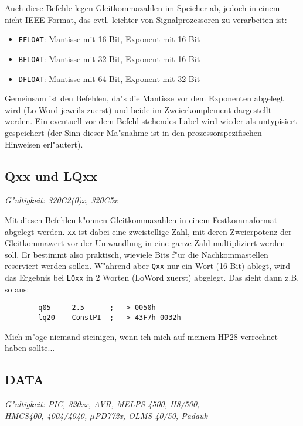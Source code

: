 \documentclass[12pt,a4paper,twoside]{report}
\makeatletter
\newcommand{\tty}[1]{{\tt #1}}
\newcommand{\ttindex}[1]{\index{#1@{\tt #1}}}
\makeatother
\begin{document}
Auch diese Befehle legen Gleitkommazahlen im Speicher ab,
jedoch in einem nicht-IEEE-Format, das evtl. leichter von
Signalprozessoren zu verarbeiten ist:
\begin{itemize}
\item{\tty{EFLOAT}: Mantisse mit 16 Bit, Exponent mit 16 Bit}
\item{\tty{BFLOAT}: Mantisse mit 32 Bit, Exponent mit 16 Bit}
\item{\tty{DFLOAT}: Mantisse mit 64 Bit, Exponent mit 32 Bit}
\end{itemize}
Gemeinsam ist den Befehlen, da"s die Mantisse vor dem
Exponenten abgelegt wird (Lo-Word jeweils zuerst) und
beide im Zweierkomplement dargestellt werden.  Ein eventuell
vor dem Befehl stehendes Label wird wieder als untypisiert
gespeichert (der Sinn dieser Ma"snahme ist in den
prozessorspezifischen Hinweisen erl"autert).


\subsection{Qxx und LQxx}
\ttindex{Qxx}\ttindex{LQxx}

{\em G"ultigkeit: 320C2(0)x, 320C5x}

Mit diesen Befehlen k"onnen Gleitkommazahlen in einem Festkommaformat
abgelegt werden.  \tty{xx} ist dabei eine zweistellige Zahl, mit deren
Zweierpotenz der Gleitkommawert vor der Umwandlung in eine ganze Zahl
multipliziert werden soll.  Er bestimmt also praktisch, wieviele Bits
f"ur die Nachkommastellen reserviert werden sollen.  W"ahrend aber
\tty{Qxx} nur ein Wort (16 Bit) ablegt, wird das Ergebnis bei \tty{LQxx}
in 2 Worten (LoWord zuerst) abgelegt.  Das sieht dann z.B. so
aus:
\begin{verbatim}
        q05     2.5      ; --> 0050h
        lq20    ConstPI  ; --> 43F7h 0032h
\end{verbatim}
Mich m"oge niemand steinigen, wenn ich mich auf meinem HP28
verrechnet haben sollte...


\subsection{DATA}
\ttindex{DATA}

{\em G"ultigkeit: PIC, 320xx, AVR, MELPS-4500, H8/500, \\
     HMCS400, 4004/4040, $\mu$PD772x, OLMS-40/50, Padauk}
\end{document}

